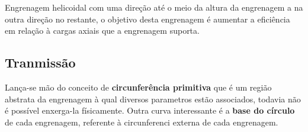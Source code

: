 \begin{namedtheorem}

Engrenagem helicoidal com uma direção até o meio da altura da engrenagem a na outra direção no restante, o objetivo desta engrenagem é aumentar a eficiência em relação à cargas axiais que a engrenagem suporta.

\end{namedtheorem}

\subsection{Tranmissão}

Lança-se mão do conceito de \textbf{circunferência primitiva} que é um região abstrata da engrenagem à qual diversos parametros estão associados, todavia não é possível enxerga-la físicamente. Outra curva interessante é a \textbf{base do círculo} de cada engrenagem, referente à circunferenci externa de cada engrenagem.
	
